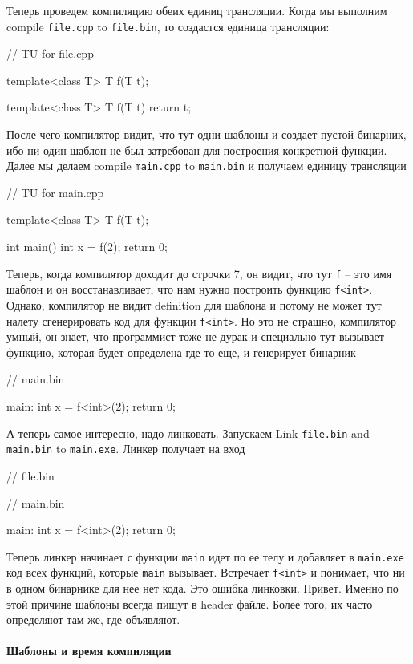 \documentclass{article}
\begin{document}
Теперь проведем компиляцию обеих единиц трансляции. Когда мы выполним compile \verb"file.cpp" to \verb"file.bin", то создастся единица трансляции:
\begin{cppcode}
// TU for file.cpp

template<class T>
T f(T t);

template<class T>
T f(T t) {
  return t;
}
\end{cppcode}
После чего компилятор видит, что тут одни шаблоны и создает пустой бинарник, ибо ни один шаблон не был затребован для построения конкретной функции. Далее мы делаем compile \verb"main.cpp" to \verb"main.bin" и получаем единицу трансляции
\begin{cppcode}
// TU for main.cpp

template<class T>
T f(T t);

int main() {
  int x = f(2);
  return 0;
}
\end{cppcode}
Теперь, когда компилятор доходит до строчки 7, он видит, что тут \verb"f" -- это имя шаблон и он восстанавливает, что нам нужно построить функцию \verb"f<int>". Однако, компилятор не видит definition для шаблона и потому не может тут налету сгенерировать код для функции \verb"f<int>". Но это не страшно, компилятор умный, он знает, что программист тоже не дурак и специально тут вызывает функцию, которая будет определена где-то еще, и генерирует бинарник
\begin{cppcode}
// main.bin

main:
  int x = f<int>(2);
  return 0;
\end{cppcode}
А теперь самое интересно, надо линковать. Запускаем Link \verb"file.bin" and \verb"main.bin" to \verb"main.exe". Линкер получает на вход
\begin{cppcode}
// file.bin

// main.bin

main:
  int x = f<int>(2);
  return 0;
\end{cppcode}
Теперь линкер начинает с функции \verb"main" идет по ее телу и добавляет в \verb"main.exe" код всех функций, которые \verb"main" вызывает. Встречает \verb"f<int>" и понимает, что ни в одном бинарнике для нее нет кода. Это ошибка линковки. Привет. Именно по этой причине шаблоны всегда пишут в header файле. Более того, их часто определяют там же, где объявляют.


\paragraph{Шаблоны и время компиляции}
\end{document}
